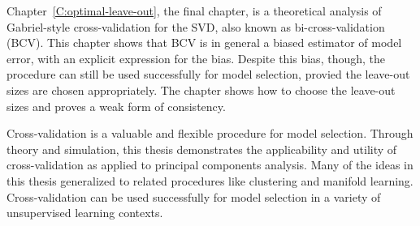 Chapter~\ref{C:optimal-leave-out}, the final chapter, is a theoretical analysis of Gabriel-style cross-validation for the SVD, also known as bi-cross-validation (BCV).  This chapter shows that BCV is in general a biased estimator of model error, with an explicit expression for the bias.  Despite this bias, though, the procedure can still be used successfully for model selection, provied the leave-out sizes are chosen appropriately.  The chapter shows how to choose the leave-out sizes and proves a weak form of consistency.

Cross-validation is a valuable and flexible procedure for model selection.  Through theory and simulation, this thesis demonstrates the applicability and utility of cross-validation as applied to principal components analysis.  Many of the ideas in this thesis generalized to related procedures like clustering and manifold learning.  Cross-validation can be used successfully for model selection in a variety of unsupervised learning contexts.
